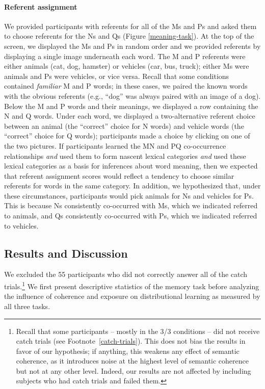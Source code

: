 \documentclass[man,floatsintext]{apa6}
\begin{document}
\paragraph{Referent assignment}
We provided participants with referents for all of the Ms and Ps and asked them to choose referents for the Ns and Qs (Figure \ref{meaning-task}). At the top of the screen, we displayed the Ms and Ps in random order and we provided referents by displaying a single image underneath each word. The M and P referents were either animals (cat, dog, hamster) or vehicles (car, bus, truck); either Ms were animals and Ps were vehicles, or vice versa. Recall that some conditions contained \emph{familiar} M and P words; in these cases, we paired the known words with the obvious referents (e.g., ``dog'' was always paired with an image of a dog). Below the M and P words and their meanings, we displayed a row containing the N and Q words. Under each word, we displayed a two-alternative referent choice between an animal (the ``correct'' choice for N words) and vehicle words (the ``correct'' choice for Q words); participants made a choice by clicking on one of the two pictures. If participants learned the MN and PQ co-occurrence relationships \emph{and} used them to form nascent lexical categories \emph{and} used these lexical categories as a basis for inferences about word meaning, then we expected that referent assignment scores would reflect a tendency to choose similar referents for words in the same category. In addition, we hypothesized that, under these circumstances, participants would pick animals for Ns  and vehicles for Ps. This is because Ns consistently co-occurred with Ms, which we indicated referred to animals, and Qs consistently co-occurred with Ps, which we indicated referred to vehicles.

\subsection{Results and Discussion}
We excluded the 55 participants who did not correctly answer all of the catch trials.\footnote{ Recall that some participants -- mostly in the 3/3 conditions --  did not receive catch trials (see Footnote~\ref{catch-trials}). This does not bias the results in favor of our hypothesis; if anything, this weakens any effect of semantic coherence, as it introduces noise at the highest level of semantic coherence but not at any other level. Indeed, our results are not affected by including subjects who had catch trials and failed them.} We first present descriptive statistics of the memory task before analyzing the influence of coherence and exposure on distributional learning as measured by all three tasks. 
\end{document}
